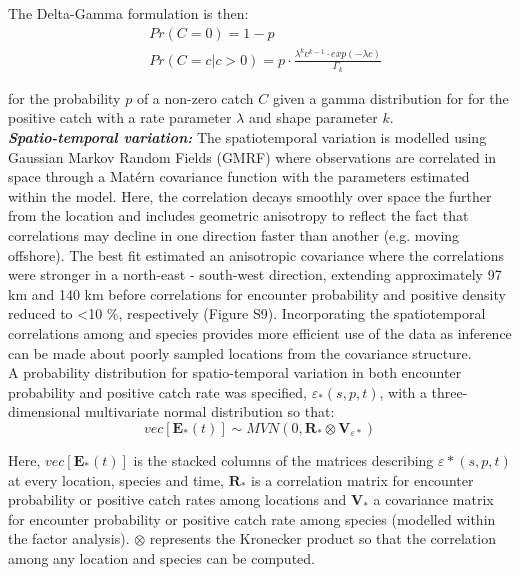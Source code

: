 \documentclass[fleqn,10pt]{wlscirep}
\begin{document}
\begin{linenumbers}
The Delta-Gamma formulation is then:
\begin{equation}
	\begin{split}
	& Pr(C = 0) = 1 - p \\
	& Pr(C = c | c > 0) = p \cdot \frac{\lambda^{k}c^{k-1} \cdot exp(-\lambda c)}{\Gamma_{k}}
	\end{split}
\end{equation}

for the probability $p$ of a non-zero catch $C$ given a gamma distribution for
for the positive catch with a rate parameter $\lambda$ and shape parameter
$k$.\\

\textbf{\textit{Spatio-temporal variation:}} The spatiotemporal variation is
modelled using Gaussian Markov Random Fields (GMRF) where observations are
correlated in space through a Matérn covariance function with the parameters
estimated within the model. Here, the correlation decays smoothly over space
the further from the location and includes geometric anisotropy to reflect the
fact that correlations may decline in one direction faster than another (e.g.
moving offshore)\cite{Thorson2013}.  The best fit estimated an anisotropic
covariance where the correlations were stronger in a north-east - south-west
direction, extending approximately 97 km and 140 km before correlations for
encounter probability and positive density reduced to \textless 10 \%,
respectively (Figure S9).  Incorporating the spatiotemporal correlations among
and species provides more efficient use of the data as inference can be made
about poorly sampled locations from the covariance structure.\\

A probability distribution for spatio-temporal variation in both encounter
probability and positive catch rate was specified, $\varepsilon_{*}(s,p,t)$,
with a three-dimensional multivariate normal distribution so that:
	\begin{equation}
		vec[\mathbf{E}_{*}(t)] \sim MVN(0,\mathbf{R}_{*} \otimes
		\mathbf{V}_{{\varepsilon}{*}})
	\end{equation}

Here, $vec[\mathbf{E}_{*}(t)]$ is the stacked columns of the matrices
describing $\varepsilon{*}(s,p,t)$ at every location, species and time,
$\mathbf{R}_{*}$ is a correlation matrix for encounter probability or positive
catch rates among locations and $\mathbf{V}_{*}$ a covariance matrix for
encounter probability or positive catch rate among species (modelled
within the factor analysis). $\otimes$ represents the Kronecker product so that
the correlation among any location and species can be
computed\cite{Thorson2017}.\\
		

\end{linenumbers}
\end{document}
